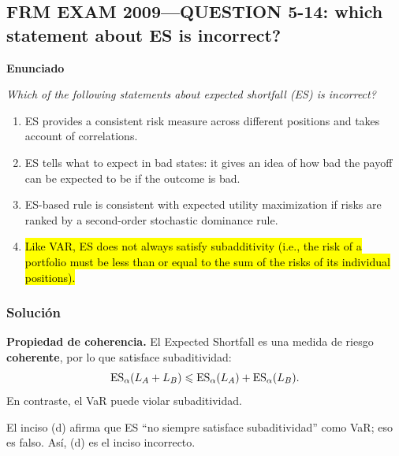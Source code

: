 ﻿\subsection{FRM EXAM 2009---QUESTION 5-14: which statement about ES is incorrect?}

\textbf{Enunciado}

\emph{Which of the following statements about expected shortfall (ES) is incorrect?}
\begin{enumerate}[label=\alph*.]
\item ES provides a consistent risk measure across different positions and takes account of correlations.
\item ES tells what to expect in bad states: it gives an idea of how bad the payoff can be expected to be if the outcome is bad.
\item ES-based rule is consistent with expected utility maximization if risks are ranked by a second-order stochastic dominance rule.
\item \hl{Like VAR, ES does not always satisfy subadditivity (i.e., the risk of a portfolio must be less than or equal to the sum of the risks of its individual positions).}
\end{enumerate}

\subsubsection*{Solución}


\textbf{Propiedad de coherencia. }El Expected Shortfall es una medida de riesgo \textbf{coherente}, por lo que satisface subaditividad:
\[
\mathrm{ES}_\alpha(L_A+L_B)\leqslant \mathrm{ES}_\alpha(L_A)+\mathrm{ES}_\alpha(L_B).
\]
En contraste, el VaR puede violar subaditividad.


El inciso (d) afirma que ES ``no siempre satisface subaditividad'' como VaR; eso es falso.
Así, (d) es el inciso incorrecto.













